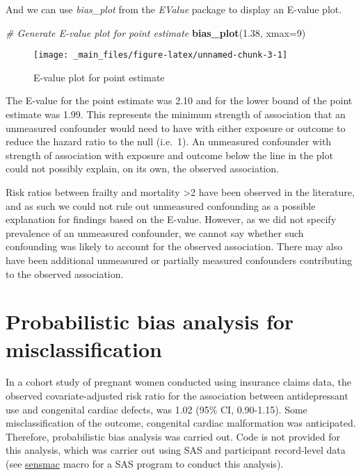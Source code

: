 \documentclass[
]{book}
\newenvironment{Shaded}{\begin{snugshade}}{\end{snugshade}}
\newcommand{\AttributeTok}[1]{\textcolor[rgb]{0.13,0.29,0.53}{#1}}
\newcommand{\CommentTok}[1]{\textcolor[rgb]{0.56,0.35,0.01}{\textit{#1}}}
\newcommand{\DecValTok}[1]{\textcolor[rgb]{0.00,0.00,0.81}{#1}}
\newcommand{\FloatTok}[1]{\textcolor[rgb]{0.00,0.00,0.81}{#1}}
\newcommand{\FunctionTok}[1]{\textcolor[rgb]{0.13,0.29,0.53}{\textbf{#1}}}
\newcommand{\NormalTok}[1]{#1}
\begin{document}
And we can use \emph{bias\_plot} from the \emph{EValue} package to display an E-value plot.

\begin{Shaded}
\begin{Highlighting}[]
\CommentTok{\# Generate E{-}value plot for point estimate}
\FunctionTok{bias\_plot}\NormalTok{(}\FloatTok{1.38}\NormalTok{, }\AttributeTok{xmax=}\DecValTok{9}\NormalTok{) }
\end{Highlighting}
\end{Shaded}

\begin{figure}

{\centering \texttt{[image: \_main\_files/figure-latex/unnamed-chunk-3-1]} 

}

\caption{E-value plot for point estimate}\label{fig:unnamed-chunk-3}
\end{figure}

The E-value for the point estimate was 2.10 and for the lower bound of the point estimate was 1.99. This represents the minimum strength of association that an unmeasured confounder would need to have with either exposure or outcome to reduce the hazard ratio to the null (i.e.~1). An unmeasured confounder with strength of association with exposure and outcome below the line in the plot could not possibly explain, on its own, the observed association.

Risk ratios between frailty and mortality \textgreater2 have been observed in the literature, and as such we could not rule out unmeasured confounding as a possible explanation for findings based on the E-value. However, as we did not specify prevalence of an unmeasured confounder, we cannot say whether such confounding was likely to account for the observed association. There may also have been additional unmeasured or partially measured confounders contributing to the observed association.

\hypertarget{probabilistic-bias-analysis-for-misclassification}{%
\section{Probabilistic bias analysis for misclassification}\label{probabilistic-bias-analysis-for-misclassification}}

In a cohort study of pregnant women conducted using insurance claims data, the observed covariate-adjusted risk ratio for the association between antidepressant use and congenital cardiac defects, was 1.02 (95\% CI, 0.90-1.15).\citep{huybrechts2014antidepressant} Some misclassification of the outcome, congenital cardiac malformation was anticipated. Therefore, probabilistic bias analysis was carried out.\citep{fox2005method} Code is not provided for this analysis, which was carrier out using SAS and participant record-level data (see \href{https://sites.google.com/site/biasanalysis/sensmac}{sensmac} macro for a SAS program to conduct this analysis).
\end{document}

